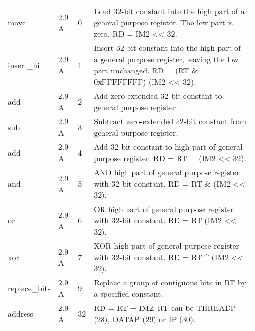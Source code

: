 \documentclass[forwardcom.tex]{subfiles}
\begin{document}
\begin{longtable} {|p{25mm}|p{14mm}|p{10mm}|p{95mm}|}
move          & 2.9 A &  0  & Load 32-bit constant into the high part of a general purpose register. The low part is zero. RD = IM2 \textless\textless{} 32. \\
insert\_hi    & 2.9 A &  1  & Insert 32-bit constant into the high part of a general purpose register, leaving the low part unchanged.
RD = (RT \& 0xFFFFFFFF) \textbar{} (IM2 \textless\textless{} 32). \\
add           & 2.9 A &  2  & Add zero-extended 32-bit constant to general purpose register. \\
sub           & 2.9 A &  3  & Subtract zero-extended 32-bit constant from general purpose register. \\
add           & 2.9 A &  4  & Add 32-bit constant to high part of general purpose register. RD = RT + (IM2 \textless\textless{} 32). \\
and           & 2.9 A &  5  & AND high part of general purpose register with 32-bit constant. RD = RT \& (IM2 \textless\textless{} 32). \\
or            & 2.9 A &  6  & OR high part of general purpose register with 32-bit constant. RD = RT \textbar{} (IM2 \textless\textless{} 32). \\
xor           & 2.9 A &  7  & XOR high part of general purpose register with 32-bit constant. RD = RT \^{} (IM2 \textless\textless{} 32). \\
replace\_bits & 2.9 A &  9  & Replace a group of contiguous bits in RT by a specified constant. \\
address       & 2.9 A & 32  & RD = RT + IM2, RT can be THREADP (28), DATAP (29) or IP (30). \\
\hline
\end{longtable}
\end{document}
